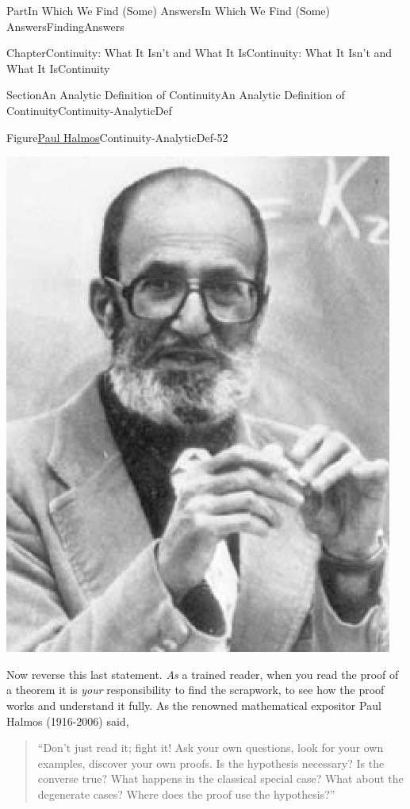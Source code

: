 \documentclass[oneside,10pt,]{book}
\numberwithin{equation}{part}
\begin{document}
\begin{partptx}{Part}{In Which We Find (Some) Answers}{}{In Which We Find (Some) Answers}{}{}{FindingAnswers}
\begin{chapterptx}{Chapter}{Continuity: What It Isn't and What It Is}{}{Continuity: What It Isn't and What It Is}{}{}{Continuity}
\begin{sectionptx}{Section}{An Analytic Definition of Continuity}{}{An Analytic Definition of Continuity}{}{}{Continuity-AnalyticDef}
\begin{figureptx}{Figure}{\href{https://mathshistory.st-andrews.ac.uk/Biographies/Halmos/}{Paul Halmos}}{Continuity-AnalyticDef-52}{}%
%
%
\begin{image}{0.325}{0.35}{0.325}{}%
\includegraphics[width=\linewidth]{external/images/Halmos.png}
\end{image}%
\tcblower
\end{figureptx}%
 Now reverse this last statement.  \emph{As} a trained reader, when you read the proof of a theorem it is \emph{your} responsibility to find the scrapwork, to see how the proof works and understand it fully.  As the renowned mathematical expositor Paul Halmos  (1916-2006) said,%
\begin{quote}%
``Don't just read it; fight it! Ask your own questions, look for your own examples, discover your own proofs. Is the hypothesis necessary? Is the converse true? What happens in the classical special case? What about the degenerate cases? Where does the proof use the hypothesis?''%

\end{quote}
\end{sectionptx}
\end{chapterptx}
\end{partptx}
\end{document}
